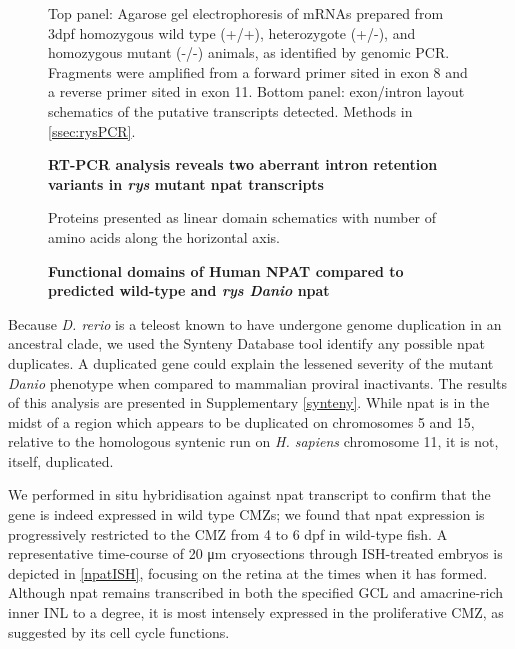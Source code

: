 \begin{figure}[!h]
    \caption{{\bf RT-PCR analysis reveals two aberrant intron retention variants in \textit{rys} mutant npat transcripts}}
    \label{npattranscript}
    Top panel: Agarose gel electrophoresis of mRNAs prepared from 3dpf homozygous wild type (+/+), heterozygote (+/-), and homozygous mutant (-/-) animals, as identified by genomic PCR. Fragments were amplified from a forward primer sited in exon 8 and a reverse primer sited in exon 11.
    Bottom panel: exon/intron layout schematics of the putative transcripts detected.
    Methods in \autoref{ssec:rysPCR}.
\end{figure}

\begin{figure}[!h]
    \caption{{\bf Functional domains of Human NPAT compared to predicted wild-type and \textit{rys Danio} npat}}
    Proteins presented as linear domain schematics with number of amino acids along the horizontal axis.
    \label{npatprotein}
\end{figure}
\FloatBarrier

Because \textit{D. rerio} is a teleost known to have undergone genome duplication in an ancestral clade, we used the Synteny Database tool \cite{Catchen2009} identify any possible npat duplicates. A duplicated gene could explain the lessened severity of the mutant \textit{Danio} phenotype when compared to mammalian proviral inactivants. The results of this analysis are presented in Supplementary \autoref{synteny}. While npat is in the midst of a region which appears to be duplicated on chromosomes 5 and 15, relative to the homologous syntenic run on \textit{H. sapiens} chromosome 11, it is not, itself, duplicated.

We performed in situ hybridisation against npat transcript to confirm that the gene is indeed expressed in wild type CMZs; we found that npat expression is progressively restricted to the CMZ from 4 to 6 dpf in wild-type fish. A representative time-course of 20 \si{\micro\metre} cryosections through ISH-treated embryos is depicted in \autoref{npatISH}, focusing on the retina at the times when it has formed. Although npat remains transcribed in both the specified GCL and amacrine-rich inner INL to a degree, it is most intensely expressed in the proliferative CMZ, as suggested by its cell cycle functions.

